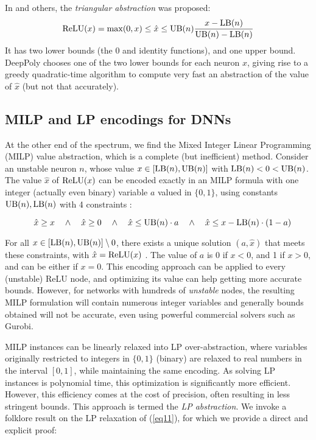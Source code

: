 In \cite{DBLP_Ehlers17,deeppoly} and others, the {\em triangular abstraction} was proposed:
\begin{align}
	\mathrm{ReLU}(x) = \max (0,x) \leq \hat{x} \leq \mathrm{UB}(n) \frac{x-\mathrm{LB}(n)}{\mathrm{UB}(n)-\mathrm{LB}(n)} 
	\label{eq:deeppoly}
\end{align} 
It has two lower bounds (the 0 and identity functions), and one upper bound. 
DeepPoly \cite{deeppoly} chooses one of the two lower bounds for each neuron $x$, giving rise to a greedy quadratic-time algorithm to compute very fast an abstraction of the value of $\hat{x}$ (but not that accurately).




\subsection{MILP and LP encodings for DNNs}

At the other end of the spectrum, we find the Mixed Integer Linear Programming (MILP) value abstraction, which is a complete (but inefficient) method. 
Consider an unstable neuron $n$, whose value $x \in [\mathrm{LB}(n),\mathrm{UB}(n)]$ with $\mathrm{LB}(n)<0<\mathrm{UB}(n)$.
The value $\hat{x}$ of $\mathrm{ReLU}(x)$ can be encoded exactly in an MILP formula with one 
integer (actually even binary) variable $a$ valued in $\{0,1\}$, using constants $\mathrm{UB}(n),\mathrm{LB}(n)$ with 4 constraints \cite{MILP}:

\vspace{-0.4cm}
\begin{equation}\quad \hat{x} \geq x \quad \wedge \quad \hat{x} \geq 0 \quad \wedge \quad \hat{x} \leq \mathrm{UB}(n) \cdot a \quad \wedge \quad \hat{x} \leq x-\mathrm{LB}(n) \cdot (1-a)
\label{eq11}
\end{equation}

For all $x \in [\mathrm{LB}(n),\mathrm{UB}(n)] \setminus 0$, there exists a unique solution $(a,\hat{x})$ that meets these constraints, with $\hat{x}=\mathrm{ReLU}(x)$ \cite{MILP}. The value of $a$ is 0 if $x < 0$, and 1 if $x>0$, and can be either if $x=0$. This encoding approach can be applied to every (unstable) ReLU node, and optimizing its value can help getting more accurate bounds. However, for networks with hundreds of {\em unstable} nodes, the resulting MILP formulation will contain numerous integer variables and generally bounds obtained will not be accurate, even using powerful commercial solvers such as Gurobi.

MILP instances can be linearly relaxed into LP over-abstraction, where variables originally restricted to integers in $\{0,1\}$ (binary) are relaxed to real numbers in the interval $[0,1]$, while maintaining the same encoding. As solving LP instances is polynomial time, this optimization is significantly more efficient. However, this efficiency comes at the cost of precision, often resulting in less stringent bounds. This approach is termed the {\em LP abstraction}. We invoke a folklore result on the LP relaxation of (\ref{eq11}), for which we provide a direct and explicit proof:

